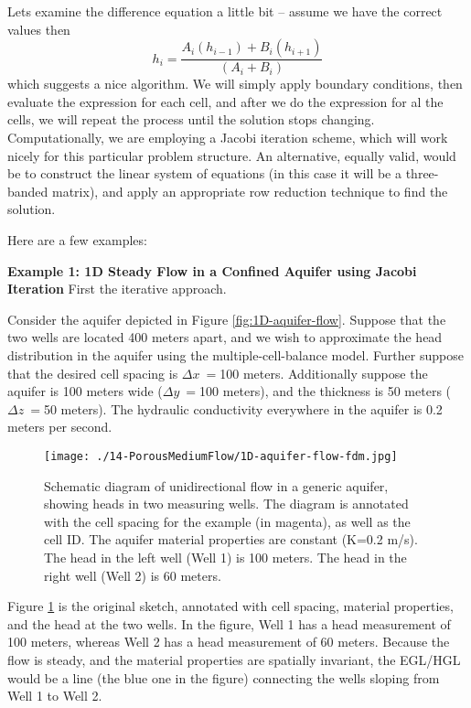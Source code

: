 Lets examine the difference equation a little bit -- assume we have the correct values then
\begin{equation}
h_{i} = \frac{A_{i}(h_{i-1}) + B_{i}(h_{i+1})}{(A_{i}+B_{i})}
\end{equation}
which suggests a nice algorithm.  
We will simply apply boundary conditions, then evaluate the expression for each cell, and after we do the expression for al the cells, we will repeat the process until the solution stops changing.  
Computationally, we are employing a Jacobi iteration scheme, which will work nicely for this particular problem structure.  
An alternative, equally valid, would be to construct the linear system of equations (in this case it will be a three-banded matrix), and apply an appropriate row reduction technique to find the solution. 

Here are a few examples:

\textbf{Example 1: 1D Steady Flow in a Confined Aquifer using Jacobi Iteration}
First the iterative approach.

Consider the aquifer depicted in Figure \ref{fig:1D-aquifer-flow}.  Suppose that the two wells are located 400 meters apart, and we wish to approximate the head distribution in the aquifer using the multiple-cell-balance model.  Further suppose that the desired cell spacing is $\Delta x~=$100 meters.  Additionally suppose the aquifer is 100 meters wide ($\Delta y~=$100 meters), and the thickness is 50 meters ($\Delta z~=$50 meters).  The hydraulic conductivity everywhere in the aquifer is 0.2 meters per second.  



\begin{figure}[h!] %
   \centering
   \texttt{[image: ./14-PorousMediumFlow/1D-aquifer-flow-fdm.jpg]} 
   \caption{Schematic diagram of unidirectional flow in a generic aquifer, showing heads in two measuring wells.  The diagram is annotated with the cell spacing for the example (in magenta), as well as the cell ID.  The aquifer material properties are constant (K=0.2 m/s).   The head in the left well (Well 1) is 100 meters.   The head in the right well (Well 2) is 60 meters.}
   \label{fig:1D-aquifer-flow-fdm}
\end{figure}

Figure \ref{fig:1D-aquifer-flow-fdm} is the original sketch, annotated with cell spacing, material properties, and the head at the two wells.  In the figure, Well 1 has a head measurement of 100 meters, whereas Well 2 has a head measurement of 60 meters.  Because the flow is steady, and the material properties are spatially invariant, the EGL/HGL would be a line (the blue one in the figure) connecting the wells sloping from Well 1 to Well 2.

